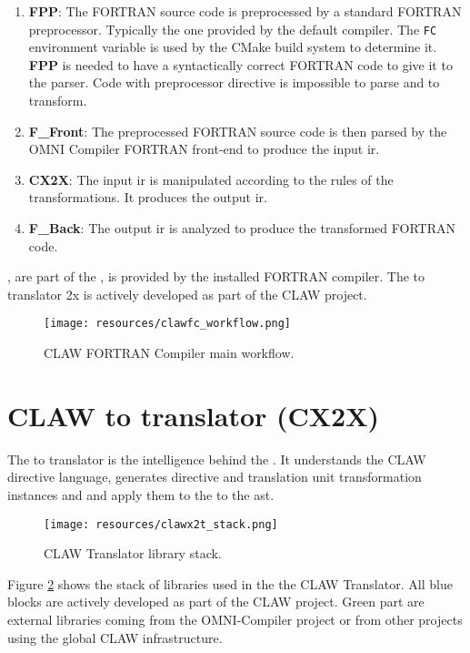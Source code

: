 \begin{enumerate}
\item \textbf{FPP}: The FORTRAN source code is preprocessed by a standard
FORTRAN preprocessor. Typically the one provided by the default compiler.
The \lstinline|FC| environment variable is used by the CMake build system to
determine it. \textbf{FPP} is needed to have a syntactically correct FORTRAN
code to give it to the parser. Code with preprocessor directive is impossible 
to parse and to transform.
\item \textbf{F\_Front}: The preprocessed FORTRAN source code is then parsed
by the OMNI Compiler FORTRAN front-end to produce the input \xcodeml \gls{ir}.
\item \textbf{CX2X}: The input \xcodeml \gls{ir} is manipulated according to
the rules of the transformations. It produces the output \xcodeml \gls{ir}.
\item \textbf{F\_Back}: The output \xcodeml \gls{ir} is analyzed to produce
the transformed FORTRAN code.
\end{enumerate}

\ffront{}, \fback{} are part of the \omni{}, \fpp{} is provided by the
installed FORTRAN compiler. The \xcodeml to \xcodeml translator \cx2x{} is
actively developed as part of the CLAW project.

\begin{figure}[!ht]
  \centering
  \texttt{[image: resources/clawfc\_workflow.png]} \\
  \caption{CLAW FORTRAN Compiler main workflow.}
  \label{fig:clawfc_main_workflow}
\end{figure}

\section{CLAW \xcodeml to \xcodeml translator (CX2X)}
The \xcodeml to \xcodeml translator is the intelligence behind the \clawfcomp. It
understands the CLAW directive language, generates directive and translation unit
transformation instances and and apply them to the to the \xcodeml \gls{ast}.

\begin{figure}[!ht]
  \centering
  \texttt{[image: resources/clawx2t\_stack.png]} \\
  \caption{CLAW \xcodeml Translator library stack.}
  \label{fig:clawx2_stack}
\end{figure}

Figure \ref{fig:clawx2_stack} shows the stack of libraries used in the the CLAW
\xcodeml Translator. All blue blocks are actively developed as part of the CLAW
project. Green part are external libraries coming from the OMNI-Compiler project
or from other projects using the global CLAW infrastructure.
